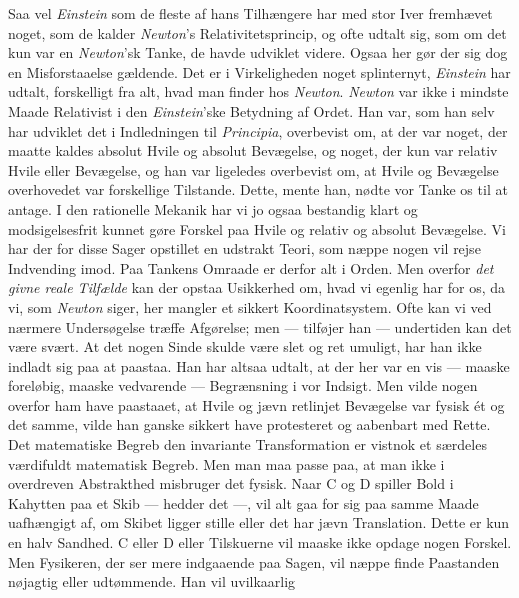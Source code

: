 \documentclass[12pt,a4paper]{article}
\newcommand{\opage}[1]{\marginnote{\footnotesize\textit{[#1]}}}
\begin{document}
Saa vel \emph{Einstein} som de fleste af hans Tilhængere har med stor Iver
fremhævet noget, som de kalder \emph{Newton}'s \guillemotright
Relativitetsprincip\guillemotleft, og ofte udtalt sig, som om det kun var
en \emph{Newton}'sk Tanke, de havde udviklet videre. Ogsaa her gør der sig
dog en Misforstaaelse gældende. Det er i Virkeligheden noget splinternyt,
\emph{Einstein} har udtalt, forskelligt fra alt, hvad man finder hos
\emph{Newton}. \emph{Newton} var ikke i mindste Maade Relativist i den
\emph{Einstein}'ske Betydning af Ordet. Han var, som han selv har udviklet
det i Indledningen til \emph{Principia}, overbevist om, at der var noget,
der maatte kaldes absolut Hvile og absolut Bevægelse, og noget, der kun var
relativ Hvile eller Bevægelse, og han var ligeledes overbevist om, at Hvile
og Bevægelse overhovedet var forskellige Tilstande. Dette, mente han, nødte
vor Tanke os til at antage. I den rationelle Mekanik har vi jo ogsaa
bestandig klart og modsigelsesfrit kunnet gøre Forskel paa Hvile og relativ
og absolut Bevægelse. Vi har der for disse Sager opstillet en udstrakt
Teori, som næppe nogen vil rejse Indvending imod. Paa Tankens Omraade er
derfor alt i Orden. Men overfor \emph{det givne reale Tilfælde} kan der
opstaa Usikkerhed om, hvad vi egenlig har for os, da vi,
\opage{18} som \emph{Newton} siger, her mangler et sikkert Koordinatsystem. Ofte kan
vi ved nærmere Undersøgelse træffe Afgørelse; men --- tilføjer han ---
undertiden kan det være \guillemotright svært\guillemotleft. At det nogen
Sinde skulde være slet og ret umuligt, har han ikke indladt sig paa at
paastaa. Han har altsaa udtalt, at der her var en vis --- maaske
foreløbig, maaske vedvarende --- Begrænsning i vor Indsigt. Men vilde
nogen overfor ham have paastaaet, at Hvile og jævn retlinjet Bevægelse var
fysisk ét og det samme, vilde han ganske sikkert have protesteret og
aabenbart med Rette. Det matematiske Begreb \guillemotright den invariante
Transformation\guillemotleft{} er vistnok et særdeles værdifuldt
matematisk Begreb. Men man maa passe paa, at man ikke i overdreven
Abstrakthed misbruger det fysisk. Naar C og D spiller Bold i Kahytten paa
et Skib --- hedder det ---, vil alt gaa for sig paa samme Maade
uafhængigt af, om Skibet ligger stille eller det har jævn Translation.
Dette er kun en halv Sandhed. C eller D eller Tilskuerne vil maaske ikke
opdage nogen Forskel. Men Fysikeren, der ser mere indgaaende paa Sagen, vil
næppe finde Paastanden nøjagtig eller udtømmende. Han vil uvilkaarlig
\end{document}
